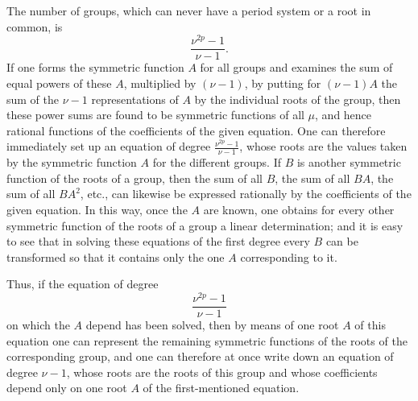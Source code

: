 \documentclass[10pt]{article}
\begin{document}
The number of groups, which can never have a period system or a root in common, is
\[
\frac{\nu^{2p}-1}{\nu-1}.
\]
If one forms the symmetric function \(A\) for all groups and examines the sum of equal powers of these \(A\), multiplied by \((\nu-1)\), by putting for \((\nu-1)A\) the sum of the \(\nu-1\) representations of \(A\) by the individual roots of the group, then these power sums are found to be symmetric functions of all \(\mu\), and hence rational functions of the coefficients of the given equation. One can therefore immediately set up an equation of degree \(\frac{\nu^{2p}-1}{\nu-1}\), whose roots are the values taken by the symmetric function \(A\) for the different groups. If \(B\) is another symmetric function of the roots of a group, then the sum of all \(B\), the sum of all \(BA\), the sum of all \(BA^2\), etc., can likewise be expressed rationally by the coefficients of the given equation. In this way, once the \(A\) are known, one obtains for every other symmetric function of the roots of a group a linear determination; and it is easy to see that in solving these equations of the first degree every \(B\) can be transformed so that it contains only the one \(A\) corresponding to it.

Thus, if the equation of degree
\[
\frac{\nu^{2p}-1}{\nu-1}
\]
on which the \(A\) depend has been solved, then by means of one root \(A\) of this equation one can represent the remaining symmetric functions of the roots of the corresponding group, and one can therefore at once write down an equation of degree \(\nu-1\), whose roots are the roots of this group and whose coefficients depend only on one root \(A\) of the first-mentioned equation.
\end{document}
